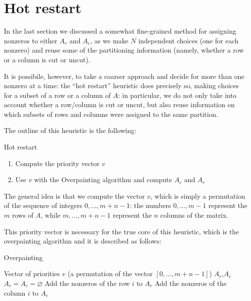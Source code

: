 \section{Hot restart}

In the last section we discussed a somewhat fine-grained method for assigning nonzeros to either $A_r$ and $A_c$, as we make $N$ independent choices (one for each nonzero) and reuse some of the partitioning information (namely, whether a row or a column is cut or uncut).

It is possibile, however, to take a coarser approach and decide for more than one nonzero at a time: the ``hot restart'' heuristic does precisely so, making choices for a subset of a row or a column of $A$: in particular, we do not only take into account whether a row/column is cut or uncut, but also reuse information on which subsets of rows and columns were assigned to the same partition.

The outline of this heuristic is the following:

\begin{algorithm}[H]
 \caption{Hot restart}
 \begin{enumerate}[(1)]
  \item Compute the priority vector $v$
  \item Use $v$ with the Overpainting algorithm and compute $A_c$ and $A_r$
 \end{enumerate}
\end{algorithm}

The general idea is that we compute the vector $v$, which is simply a permutation of the sequence of integers $0,\dots,m+n-1$: the numbers $0,\dots,m-1$ represent the $m$ rows of $A$, while $m,\dots,m+n-1$ represent the $n$ columns of the matrix.

This priority vector is necessary for the true core of this heuristic, which is the overpainting algorithm and it is described  as follows:

\begin{algorithm}[H]
\caption{Overpainting} \label{alg:overpainting}
\begin{algorithmic}
\STATE
\REQUIRE Vector of priorities $v$ (a permutation of the vector $[0,\dots,m+n-1]$)
\ENSURE $A_r$,$A_c$
\STATE
\STATE $A_r = A_c = \varnothing$
\STATE Add the nonzeros of the row $i$ to $A_r$
\ELSE
\STATE Add the nonzeros of the column $i$ to $A_c$
\ENDIF
\ENDFOR
\end{algorithmic}
\end{algorithm}

